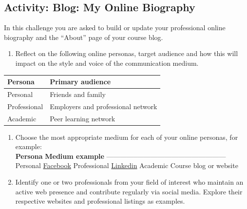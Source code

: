 \documentclass[
]{book}
\providecommand{\tightlist}{%
  \setlength{\itemsep}{0pt}\setlength{\parskip}{0pt}}
\theoremstyle{definition}
\theoremstyle{definition}
\theoremstyle{definition}
\theoremstyle{definition}
\theoremstyle{remark}
\begin{document}
\hypertarget{activity-blog-my-online-biography}{%
\subsection*{Activity: Blog: My Online Biography}\label{activity-blog-my-online-biography}}

\begin{reflect}
In this challenge you are asked to build or update your professional online biography and the ``About'' page of your course blog.

\begin{enumerate}
\def\labelenumi{\arabic{enumi}.}
\tightlist
\item
  Reflect on the following online personas, target audience and how this will impact on the style and voice of the communication medium.
\end{enumerate}

\begin{longtable}[]{@{}ll@{}}
\toprule()
\textbf{Persona} & \textbf{Primary audience} \\
\midrule()
\endhead
Personal & Friends and family \\
Professional & Employers and professional network \\
Academic & Peer learning network \\
\bottomrule()
\end{longtable}

\begin{enumerate}
\def\labelenumi{\arabic{enumi}.}
\setcounter{enumi}{1}
\item
  Choose the most appropriate medium for each of your online personas, for example:\\
  \textbar{} \textbf{Persona} \textbar{} \textbf{Medium example} \textbar{}
  \textbar--------------\textbar---------------------------------------\textbar{}
  \textbar{} Personal \textbar{} \href{https://www.facebook.com/}{Facebook} \textbar{}
  \textbar{} Professional \textbar{} \href{https://www.linkedin.com/}{Linkedin} \textbar{}
  \textbar{} Academic \textbar{} Course blog or website \textbar{}
\item
  Identify one or two professionals from your field of interest who maintain an active web presence and contribute regularly via social media. Explore their respective websites and professional listings as examples.\\
\end{enumerate}


\end{reflect}
\end{document}
